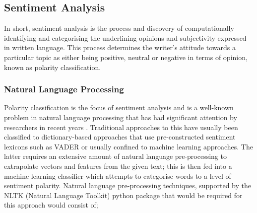 \documentclass[oneside, 12pt]{article}
\begin{document}
		
		\subsection{Sentiment Analysis}\label{sentiment}
		In short, sentiment analysis is the process and discovery of computationally identifying and categorising the underlining opinions and subjectivity expressed in written language. This process determines the writer's attitude towards a particular topic as either being positive, neutral or negative in terms of opinion, known as polarity classification. 		
			
			\subsubsection{Natural Language Processing}\label{algorithms}
			Polarity classification is the focus of sentiment analysis and is a well-known problem in natural language processing that has had significant attention by researchers in recent years \cite{1}\cite{3}\cite{6}\cite{10}. Traditional approaches to this have usually been classified to dictionary-based approaches that use pre-constructed sentiment lexicons such as VADER or usually confined to machine learning approaches. The latter requires an extensive amount of natural language pre-processing to extrapolate vectors and features from the given text; this is then fed into a machine learning classifier which attempts to categorise words to a level of sentiment polarity. Natural language pre-processing techniques, supported by the NLTK (Natural Language Toolkit) python package that would be required for this approach would consist of;
			
\end{document}
